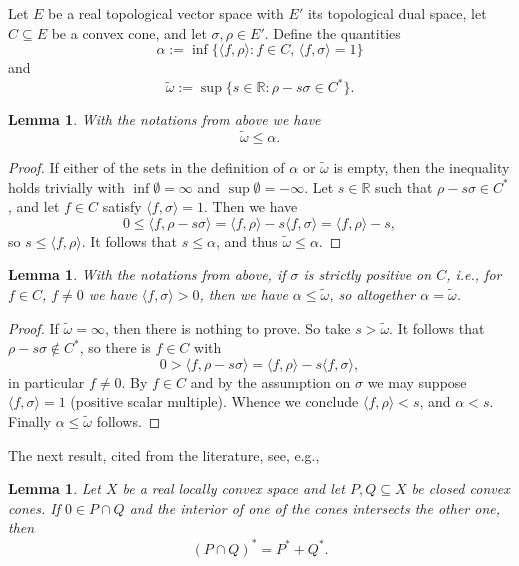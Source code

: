 \documentclass[[a4paper,english,12pt]{amsart}
\theoremstyle{plain}
\newtheorem{lemma}[theorem]{Lemma}
\theoremstyle{remark}
\newcommand{\RR}{\mathbb R}
\newcommand{\si}{\sigma}
\newcommand{\rh}{\rho}
\begin{document}
Let  $E$ be a  real topological vector space with $E'$ its topological dual space, let $C\subseteq E$ be a convex cone, and let $\si,\rh\in E'$. Define the quantities
\[
 \alpha :=\inf\{\langle f,\rh\rangle:f\in C,\, \langle f,\si\rangle=1\}
  \]
  and
   \[
 \widetilde{\omega}:=\sup\{s\in \RR:\rh-s\si\in  C^*\}.
 \]
\begin{lemma}
With the notations from above we  have
 \[
\widetilde{\omega}\leq\alpha.
 \]
\end{lemma}
\begin{proof}
	If either of the sets in the definition of $\alpha$ or $\widetilde{\omega}$ is empty, then the inequality holds trivially with $\inf\emptyset=\infty$ and $\sup\emptyset=-\infty$.
Let $s\in\RR$ such that $\rh-s\si\in C^{*}$, and let $f\in C$ satisfy $\langle f,\si\rangle=1$. Then we have
 \[
 0\leq \langle f,\rh-s\si\rangle =\langle f,\rh\rangle-s\langle f,\si\rangle=\langle f,\rh\rangle-s,
 \]
 so $s\leq \langle f,\rh\rangle$. It follows that $s\leq \alpha$, and thus $ \widetilde{\omega}\leq \alpha$.
\end{proof}



\begin{lemma}\label{lem:2ao}
With the notations from above, if  $\si$ is strictly positive on $C$, i.e., for $f\in C$, $f\neq0$ we have $\langle f,\si\rangle>0$,  then
we have $\alpha\leq\widetilde{\omega}$, so altogether $\alpha=\widetilde{\omega}$.
 \end{lemma}
 \begin{proof}
If $\widetilde{\omega}=\infty$, then there is nothing to prove. So take  $s>\widetilde{\omega}$. It follows that $\rh-s\si\not\in C^{*}$, so there is $f\in C$ with
 \[
 0>\langle f,\rh-s\si\rangle=\langle f,\rh\rangle-s\langle f,\si\rangle,
 \]
in particular $f\neq 0$. By $f\in C$ and by the assumption on $\si$ we may suppose $\langle f,\si\rangle=1$ (positive scalar multiple). Whence we conclude
 $\langle f,\rh\rangle<s$, and  $\alpha<s$.
 Finally $\alpha\leq \widetilde{\omega}$ follows.
 \end{proof}

 The next result, cited from the literature, see, e.g., \cite[Lemma 2.1 (a)]{JeyaWolf}
 \begin{lemma}\label{lem:coneinter1}
	 Let $X$ be a real locally convex space and let $P,Q\subseteq X$ be closed convex cones.
If $0\in P\cap Q$ and the interior of one of the cones intersects the other one, then
		 \[
		 (P\cap Q)^*=P^*+Q^*.
		 \]
\end{lemma}
\end{document}
